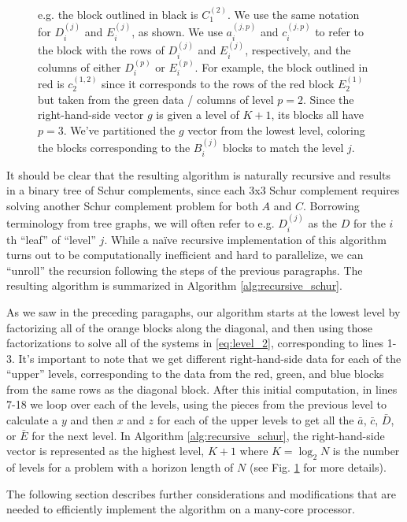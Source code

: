 \documentclass[../root.tex]{subfiles}
\newcommand{\0}{{\transparent{0} \resizebox{\mycellheight}{\mycellheight}{0}}}
\begin{document}
\begin{figure}
{        e.g.  the block outlined in black is $C_1^{(2)}$. We use the same notation for
        $D_i^{(j)}$ and $E_i^{(j)}$, as shown. We use $a_i^{(j,p)}$ and $c_i^{(j,p)}$ to
        refer to the block with the rows of $D_i^{(j)}$ and $E_i^{(j)}$, respectively, and
        the columns of either $D_i^{(p)}$ or $E_i^{(p)}$. For example, the block outlined in
        red is $c_2^{(1,2)}$ since it corresponds to the rows of the red block $E_2^{(1)}$
        but taken from the green data / columns of level $p=2$. Since the right-hand-side
        vector $g$ is given a level of $K+1$, its blocks all have $p=3$. We've partitioned
        the $g$ vector from the lowest level, coloring the blocks corresponding to the
        $B_i^{(j)}$ blocks to match the level $j$.
    }
    \label{fig:kkt_partitioned}
\end{figure}
It should be clear that the resulting algorithm is naturally recursive and results in a
binary tree of Schur complements, since each 3x3 Schur complement requires solving another
Schur complement problem for both $A$ and $C$. Borrowing terminology from tree graphs, 
we will often refer to e.g. $D_i^{(j)}$ as the $D$ for the $i$th ``leaf'' of ``level'' $j$.
While a na\"ive recursive implementation of
this algorithm turns out to be computationally inefficient and hard to parallelize, we can
``unroll'' the recursion following the steps of the previous paragraphs. The resulting
algorithm is summarized in Algorithm \ref{alg:recursive_schur}. 

As we saw in the preceding paragaphs, our algorithm starts at the lowest level by
factorizing all of the orange blocks along the diagonal, and then using those
factorizations to solve all of the systems in \eqref{eq:level_2}, corresponding to lines
1-3. It's important to note that we get different right-hand-side data for each of the
``upper'' levels, corresponding to the data from the red, green, and blue blocks from the
same rows as the diagonal block.  After this initial computation, in lines 7-18 we loop over
each of the levels, using the pieces from the previous level to calculate a $y$ and then $x$
and $z$ for each of the upper levels to get all the $\bar{a}$, $\bar{c}$,
$\bar{D}$, or $\bar{E}$ for the next level. In Algorithm \ref{alg:recursive_schur}, the
right-hand-side vector is represented as the highest level, $K+1$ where $K = \log_2{N}$ is
the number of levels for a problem with a horizon length of $N$ (see Fig.
\ref{fig:kkt_partitioned} for more details). 

The following section describes further considerations and 
modifications that are needed to efficiently implement the algorithm on a many-core 
processor. 
\end{document}
